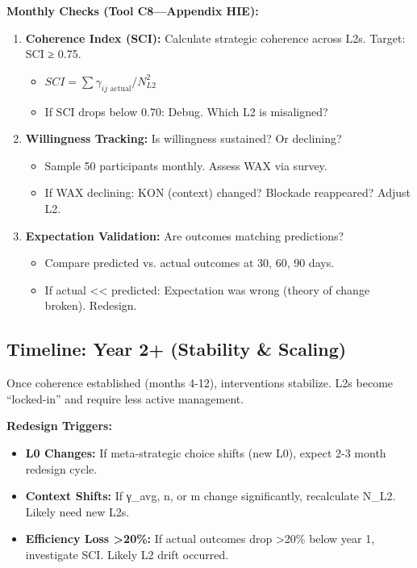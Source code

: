 \documentclass[11pt, a4paper]{article}
\begin{document}
\textbf{Monthly Checks (Tool C8---Appendix HIE):}

\begin{enumerate}
    \item \textbf{Coherence Index (SCI):} Calculate strategic coherence across L2s. Target: SCI ≥ 0.75.
    \begin{itemize}[nosep]
        \item $SCI = \sum \gamma_{ij \text{ actual}} / N_{L2}^2$
        \item If SCI drops below 0.70: Debug. Which L2 is misaligned?
    \end{itemize}

    \item \textbf{Willingness Tracking:} Is willingness sustained? Or declining?
    \begin{itemize}[nosep]
        \item Sample 50 participants monthly. Assess WAX via survey.
        \item If WAX declining: KON (context) changed? Blockade reappeared? Adjust L2.
    \end{itemize}

    \item \textbf{Expectation Validation:} Are outcomes matching predictions?
    \begin{itemize}[nosep]
        \item Compare predicted vs. actual outcomes at 30, 60, 90 days.
        \item If actual << predicted: Expectation was wrong (theory of change broken). Redesign.
    \end{itemize}
\end{enumerate}

\subsection{Timeline: Year 2+ (Stability \& Scaling)} \label{sec:ch15-part6d}

Once coherence established (months 4-12), interventions stabilize. L2s become ``locked-in'' and require less active management.

\textbf{Redesign Triggers:}
\begin{itemize}[nosep]
    \item \textbf{L0 Changes:} If meta-strategic choice shifts (new L0), expect 2-3 month redesign cycle.
    \item \textbf{Context Shifts:} If γ_avg, n, or m change significantly, recalculate N_{L2}. Likely need new L2s.
    \item \textbf{Efficiency Loss >20\%:} If actual outcomes drop >20\% below year 1, investigate SCI. Likely L2 drift occurred.
\end{itemize}
\end{document}
